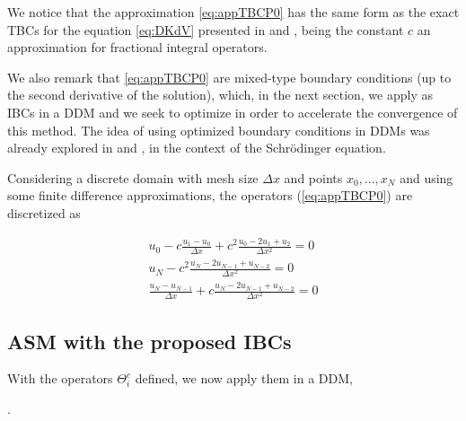\indent We notice that the approximation \eqref{eq:appTBCP0} has the same form as the exact TBCs for the equation \eqref{eq:DKdV} presented in \cite{zheng2008} and \cite{besse2015}, being the constant $c$ an approximation for fractional integral operators. 

\indent We also remark that \eqref{eq:appTBCP0} are mixed-type boundary conditions (up to the second derivative of the solution), which, in the next section, we apply as IBCs in a DDM and we seek to optimize in order to accelerate the convergence of this method. The idea of using optimized boundary conditions in DDMs was already explored in \cite{Halpern2008} and \cite{besse2017}, in the context of the Schrödinger equation.

\indent Considering a discrete domain with mesh size $\Delta x$ and points $x_0, ..., x_N$ and using some finite difference approximations, the operators (\ref{eq:appTBCP0}) are discretized as

\begin{equation}
\label{eq:appDiscTBCP0}
    \begin{gathered}
        u_0 - c \frac{u_1 - u_0}{\Delta x}  + c^2  \frac{u_0 -2u_1 + u_2}{\Delta x^2} = 0 \\
        u_N - c^2    \frac{u_N -2u_{N-1} + u_{N-2}}{\Delta x^2} = 0 \\
        \frac{u_N - u_{N-1}}{\Delta x}  + c    \frac{u_N -2u_{N-1} + u_{N-2}}{\Delta x^2} = 0 
    \end{gathered}
\end{equation}



\subsection{ASM with the proposed IBCs }

\indent With the operators $\Theta_i^c$ defined, we now apply them in a DDM, 

\indent {}.

